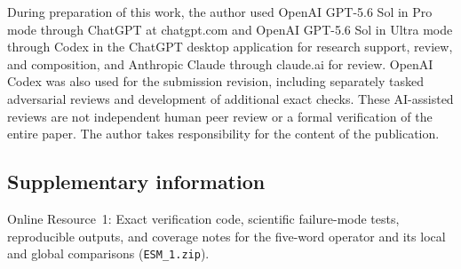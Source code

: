 \documentclass[11pt]{article}
\theoremstyle{remark}
\begin{document}
During preparation of this work, the author used OpenAI GPT-5.6 Sol in Pro
mode through ChatGPT at chatgpt.com and OpenAI GPT-5.6 Sol in Ultra mode
through Codex in the ChatGPT desktop application for research support, review,
and composition, and Anthropic Claude through claude.ai for review.
OpenAI Codex was also used for the submission revision, including separately
tasked adversarial reviews and development of additional exact checks.
These AI-assisted reviews are not independent human peer review or a formal
verification of the entire paper.  The author takes responsibility for the
content of the publication.

\subsection*{Supplementary information}

Online Resource~1: Exact verification code, scientific failure-mode tests,
reproducible outputs, and coverage notes for the five-word operator and its
local and global comparisons (\texttt{ESM\_1.zip}).
\end{document}

